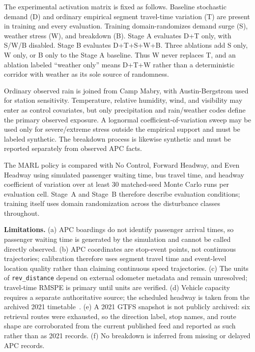 The experimental activation matrix is fixed as follows. Baseline stochastic demand (D) and ordinary empirical segment travel-time variation (T) are present in training and every evaluation. Training domain-randomizes demand surge (S), weather stress (W), and breakdown (B). Stage A evaluates D+T only, with S/W/B disabled. Stage B evaluates D+T+S+W+B. Three ablations add S only, W only, or B only to the Stage A baseline. Thus W never replaces T, and an ablation labeled ``weather only'' means D+T+W rather than a deterministic corridor with weather as its sole source of randomness.

Ordinary observed rain is joined from Camp Mabry, with Austin-Bergstrom used for station sensitivity. Temperature, relative humidity, wind, and visibility may enter as control covariates, but only precipitation and rain/weather codes define the primary observed exposure. A lognormal coefficient-of-variation sweep may be used only for severe/extreme stress outside the empirical support and must be labeled synthetic. The breakdown process is likewise synthetic and must be reported separately from observed APC facts.

The MARL policy is compared with No Control, Forward Headway, and Even Headway using simulated passenger waiting time, bus travel time, and headway coefficient of variation over at least 30 matched-seed Monte Carlo runs per evaluation cell. Stage~A and Stage~B therefore describe evaluation conditions; training itself uses domain randomization across the disturbance classes throughout.

\textbf{Limitations.} (a) APC boardings do not identify passenger arrival times, so passenger waiting time is generated by the simulation and cannot be called directly observed. (b) APC coordinates are stop-event points, not continuous trajectories; calibration therefore uses segment travel time and event-level location quality rather than claiming continuous speed trajectories. (c) The units of \texttt{rev\_distance} depend on external odometer metadata and remain unresolved; travel-time RMSPE is primary until units are verified. (d) Vehicle capacity requires a separate authoritative source; the scheduled headway is taken from the archived 2021 timetable~\cite{CapMetro2021Timetable801}. (e) A 2021 GTFS snapshot is not publicly archived: six retrieval routes were exhausted, so the direction label, stop names, and route shape are corroborated from the current published feed and reported as such rather than as 2021 records. (f) No breakdown is inferred from missing or delayed APC records.

